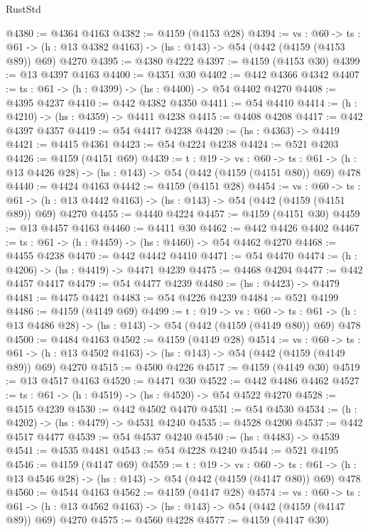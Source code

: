 \begin{lexlean}{RustStd}
\begin{coremodule}
@4380 := @4364 @4163
@4382 := @4159 (@4153 @28)
@4394 := {vs : @60} ->
  {ts : @61} -> (h : @13 @4382 @4163) -> (hs : @143) -> @54 (@442 (@4159 (@4153 @89)) @69) @4270
@4395 := @4380 @4222
@4397 := @4159 (@4153 @30)
@4399 := @13 @4397 @4163
@4400 := @4351 @30
@4402 := @442 @4366 @4342
@4407 := {ts : @61} -> (h : @4399) -> (hs : @4400) -> @54 @4402 @4270
@4408 := @4395 @4237
@4410 := @442 @4382 @4350
@4411 := @54 @4410
@4414 := (h : @4210) -> (hs : @4359) -> @4411 @4238
@4415 := @4408 @4208
@4417 := @442 @4397 @4357
@4419 := @54 @4417 @4238
@4420 := (hs : @4363) -> @4419
@4421 := @4415 @4361
@4423 := @54 @4224 @4238
@4424 := @521 @4203
@4426 := @4159 (@4151 @69)
@4439 := {t : @19} ->
  {vs : @60} ->
  {ts : @61} -> (h : @13 @4426 @28) -> (hs : @143) -> @54 (@442 (@4159 (@4151 @80)) @69) @478
@4440 := @4424 @4163
@4442 := @4159 (@4151 @28)
@4454 := {vs : @60} ->
  {ts : @61} -> (h : @13 @4442 @4163) -> (hs : @143) -> @54 (@442 (@4159 (@4151 @89)) @69) @4270
@4455 := @4440 @4224
@4457 := @4159 (@4151 @30)
@4459 := @13 @4457 @4163
@4460 := @4411 @30
@4462 := @442 @4426 @4402
@4467 := {ts : @61} -> (h : @4459) -> (hs : @4460) -> @54 @4462 @4270
@4468 := @4455 @4238
@4470 := @442 @4442 @4410
@4471 := @54 @4470
@4474 := (h : @4206) -> (hs : @4419) -> @4471 @4239
@4475 := @4468 @4204
@4477 := @442 @4457 @4417
@4479 := @54 @4477 @4239
@4480 := (hs : @4423) -> @4479
@4481 := @4475 @4421
@4483 := @54 @4226 @4239
@4484 := @521 @4199
@4486 := @4159 (@4149 @69)
@4499 := {t : @19} ->
  {vs : @60} ->
  {ts : @61} -> (h : @13 @4486 @28) -> (hs : @143) -> @54 (@442 (@4159 (@4149 @80)) @69) @478
@4500 := @4484 @4163
@4502 := @4159 (@4149 @28)
@4514 := {vs : @60} ->
  {ts : @61} -> (h : @13 @4502 @4163) -> (hs : @143) -> @54 (@442 (@4159 (@4149 @89)) @69) @4270
@4515 := @4500 @4226
@4517 := @4159 (@4149 @30)
@4519 := @13 @4517 @4163
@4520 := @4471 @30
@4522 := @442 @4486 @4462
@4527 := {ts : @61} -> (h : @4519) -> (hs : @4520) -> @54 @4522 @4270
@4528 := @4515 @4239
@4530 := @442 @4502 @4470
@4531 := @54 @4530
@4534 := (h : @4202) -> (hs : @4479) -> @4531 @4240
@4535 := @4528 @4200
@4537 := @442 @4517 @4477
@4539 := @54 @4537 @4240
@4540 := (hs : @4483) -> @4539
@4541 := @4535 @4481
@4543 := @54 @4228 @4240
@4544 := @521 @4195
@4546 := @4159 (@4147 @69)
@4559 := {t : @19} ->
  {vs : @60} ->
  {ts : @61} -> (h : @13 @4546 @28) -> (hs : @143) -> @54 (@442 (@4159 (@4147 @80)) @69) @478
@4560 := @4544 @4163
@4562 := @4159 (@4147 @28)
@4574 := {vs : @60} ->
  {ts : @61} -> (h : @13 @4562 @4163) -> (hs : @143) -> @54 (@442 (@4159 (@4147 @89)) @69) @4270
@4575 := @4560 @4228
@4577 := @4159 (@4147 @30)

\end{coremodule}
\end{lexlean}
